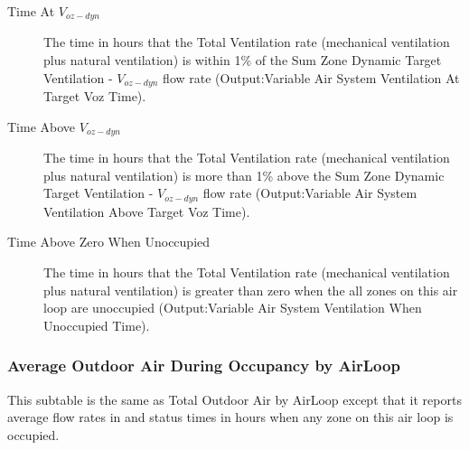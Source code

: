 \begin{description}
  \item[Time At \(V_{oz-dyn}\)] The time in hours that the Total Ventilation rate (mechanical ventilation plus natural ventilation) is within 1\% of the Sum Zone Dynamic Target Ventilation - \(V_{oz-dyn}\) flow rate (Output:Variable Air System Ventilation At Target Voz Time).

  \item[Time Above \(V_{oz-dyn}\)] The time in hours that the Total Ventilation rate (mechanical ventilation plus natural ventilation) is more than 1\% above the Sum Zone Dynamic Target Ventilation - \(V_{oz-dyn}\) flow rate (Output:Variable Air System Ventilation Above Target Voz Time).

  \item[Time Above Zero When Unoccupied] The time in hours that the Total Ventilation rate (mechanical ventilation plus natural ventilation) is greater than zero when the all zones on this air loop are unoccupied (Output:Variable Air System Ventilation When Unoccupied Time).
\end{description}

\subsubsection{Average Outdoor Air During Occupancy by AirLoop}\label{average-outdoor-air-during-occupancy-by-airloop}
This subtable is the same as Total Outdoor Air by AirLoop except that it reports average flow rates in \si{\volumeFlowRate} and status times in hours when any zone on this air loop is occupied.

